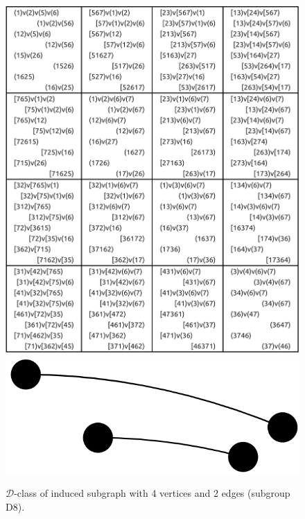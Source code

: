 \begin{appendices}
\begin{figure}[H]
\includegraphics[scale=0.1]{images/x9/x9_4v_2e_1.png}
\includegraphics[scale=0.1]{images/x9/x9_4v_2e_1_vis.png}
\caption{$\mathcal{D}$-class of induced subgraph with 4 vertices and 2 edges (subgroup D8).}
\end{figure}


\end{appendices}
